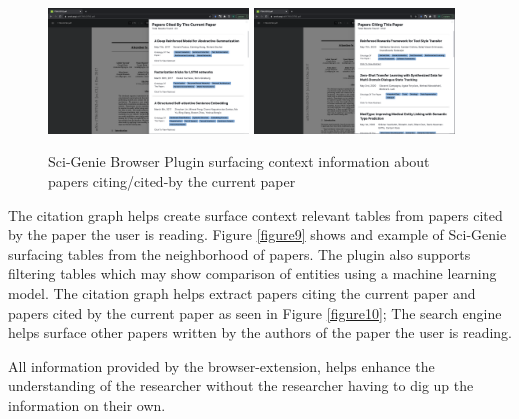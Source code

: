 \begin{figure}[h]
    \includegraphics[width=0.475\textwidth]{src/images/sci-genie-ext-cite-out-exp.png}
    \hfill
    \includegraphics[width=0.475\textwidth]{src/images/sci-genie-ext-cite-exp.png}
    \caption{ Sci-Genie Browser Plugin surfacing context information about papers citing/cited-by the current paper }
    \label{figure\arabic{figurecounter}}
\end{figure}

The citation graph helps create surface context relevant tables from papers cited by the paper the user is reading. 
Figure \ref{figure9} shows and example of Sci-Genie surfacing tables from the neighborhood of papers. The plugin also 
supports filtering tables which may show comparison of entities using a machine learning model. The citation graph helps
extract papers citing the current paper and papers cited by the current paper as seen in Figure \ref{figure10}; The search 
engine helps surface other papers written by the authors of the paper the user is reading. 

All information provided by the browser-extension, helps enhance the understanding of the researcher without the researcher 
having to dig up the information on their own. 

